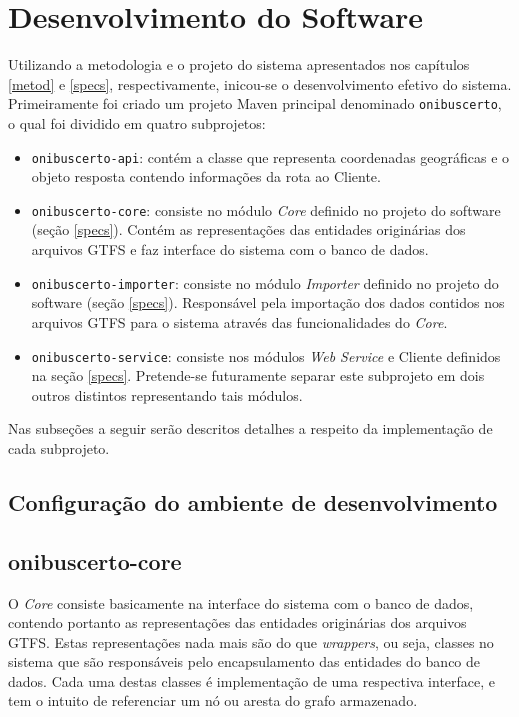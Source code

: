 \chapter{Desenvolvimento do Software}
\label{chap:desenv}

Utilizando a metodologia e o projeto do sistema apresentados nos capítulos \ref{metod} e \ref{specs}, respectivamente, inicou-se o desenvolvimento efetivo do sistema.
Primeiramente foi criado um projeto Maven principal denominado \texttt{onibuscerto}, o qual foi dividido em quatro subprojetos: 
\begin{itemize}
	\item \texttt{onibuscerto-api}: contém a classe que representa coordenadas geográficas e o objeto resposta contendo informações da rota ao Cliente.
	\item \texttt{onibuscerto-core}: consiste no módulo \emph{Core} definido no projeto do software (seção \ref{specs}). 
	Contém as representações das entidades originárias dos arquivos GTFS e faz interface do sistema com o banco de dados.
	\item \texttt{onibuscerto-importer}: consiste no módulo \emph{Importer} definido no projeto do software (seção \ref{specs}).
	Responsável pela importação dos dados contidos nos arquivos GTFS para o sistema através das funcionalidades do \emph{Core}.
	\item \texttt{onibuscerto-service}: consiste nos módulos \emph{Web Service} e Cliente definidos na seção \ref{specs}. 
	Pretende-se futuramente separar este subprojeto em dois outros distintos representando tais módulos.
\end{itemize}

Nas subseções a seguir serão descritos detalhes a respeito da implementação de cada subprojeto.

\section{Configuração do ambiente de desenvolvimento}

\section{onibuscerto-core}

O \emph{Core} consiste basicamente na interface do sistema com o banco de dados, contendo portanto as representações das entidades originárias dos arquivos GTFS.
Estas representações nada mais são do que \emph{wrappers}, ou seja, classes no sistema que são responsáveis pelo encapsulamento das entidades do banco de dados.
Cada uma destas classes é implementação de uma respectiva interface, e tem o intuito de referenciar um nó ou aresta do grafo armazenado.

